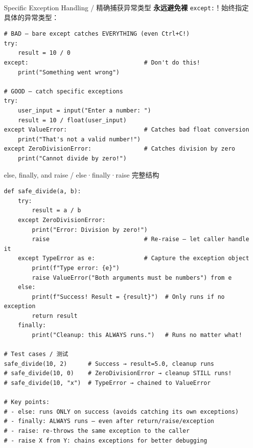 \documentclass[11pt,a4paper]{report}
\let\oldtexttt\texttt
\renewcommand{\texttt}[1]{\textcolor{mainblue}{\oldtexttt{#1}}}
\begin{document}
\begin{examplebox}{Specific Exception Handling / 精确捕获异常类型}
    \textbf{永远避免裸} \texttt{except:}！始终指定具体的异常类型：
\begin{lstlisting}
# BAD — bare except catches EVERYTHING (even Ctrl+C!)
try:
    result = 10 / 0
except:                                 # Don't do this!
    print("Something went wrong")

# GOOD — catch specific exceptions
try:
    user_input = input("Enter a number: ")
    result = 10 / float(user_input)
except ValueError:                      # Catches bad float conversion
    print("That's not a valid number!")
except ZeroDivisionError:               # Catches division by zero
    print("Cannot divide by zero!")
\end{lstlisting}
\end{examplebox}

\begin{examplebox}{else, finally, and raise / else·finally·raise 完整结构}
\begin{lstlisting}
def safe_divide(a, b):
    try:
        result = a / b
    except ZeroDivisionError:
        print("Error: Division by zero!")
        raise                           # Re-raise — let caller handle it
    except TypeError as e:              # Capture the exception object
        print(f"Type error: {e}")
        raise ValueError("Both arguments must be numbers") from e
    else:
        print(f"Success! Result = {result}")  # Only runs if no exception
        return result
    finally:
        print("Cleanup: this ALWAYS runs.")   # Runs no matter what!

# Test cases / 测试
safe_divide(10, 2)      # Success → result=5.0, cleanup runs
# safe_divide(10, 0)    # ZeroDivisionError → cleanup STILL runs!
# safe_divide(10, "x")  # TypeError → chained to ValueError

# Key points:
# - else: runs ONLY on success (avoids catching its own exceptions)
# - finally: ALWAYS runs — even after return/raise/exception
# - raise: re-throws the same exception to the caller
# - raise X from Y: chains exceptions for better debugging
\end{lstlisting}
\end{examplebox}
\end{document}
